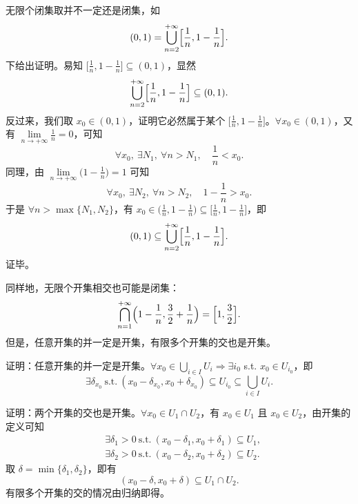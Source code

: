 \documentclass[UTF8,11pt]{ctexart}
\theoremstyle{cnthm}
\begin{document}
无限个闭集取并不一定还是闭集，如
\[
(0,1)=\bigcup_{n=2}^{+\infty}\Bigl[\frac{1}{n},1-\frac{1}{n}\Bigr].
\]
下给出证明。易知 $\bigl[\frac{1}{n},1-\frac{1}{n}\bigr]\subseteq(0,1)$，显然
\[
\bigcup_{n=2}^{+\infty}\Bigl[\frac{1}{n},1-\frac{1}{n}\Bigr]\subseteq(0,1).
\]
反过来，我们取 $x_0\in(0,1)$，证明它必然属于某个 $\bigl[\frac{1}{n},1-\frac{1}{n}\bigr]$。$\forall x_0\in(0,1)$，又有 $\lim\limits_{n\to+\infty}\frac{1}{n}=0$，可知
\[
\forall x_0,\ \exists N_1,\ \forall n>N_1,\quad \frac{1}{n}<x_0.
\]
同理，由 $\lim\limits_{n\to+\infty}\bigl(1-\frac{1}{n}\bigr)=1$ 可知
\[
\forall x_0,\ \exists N_2,\ \forall n>N_2,\quad 1-\frac{1}{n}>x_0.
\]
于是 $\forall n>\max\{N_1,N_2\}$，有 $x_0\in\bigl(\frac{1}{n},1-\frac{1}{n}\bigr)\subseteq\bigl[\frac{1}{n},1-\frac{1}{n}\bigr]$，即
\[
(0,1)\subseteq\bigcup_{n=2}^{+\infty}\Bigl[\frac{1}{n},1-\frac{1}{n}\Bigr].
\]
证毕。

同样地，无限个开集相交也可能是闭集：
\[
\bigcap_{n=1}^{+\infty}\Bigl(1-\frac{1}{n},\frac{3}{2}+\frac{1}{n}\Bigr)
=\Bigl[1,\frac{3}{2}\Bigr].
\]
但是，任意开集的并一定是开集，有限多个开集的交也是开集。

证明：任意开集的并一定是开集。$\forall x_0\in\bigcup\limits_{i\in I}U_i\Rightarrow\exists i_0$ s.t. $x_0\in U_{i_0}$，即
\[
\exists\delta_{x_0}\ \text{s.t.}\
(x_0-\delta_{x_0},x_0+\delta_{x_0})\subseteq U_{i_0}
\subseteq\bigcup_{i\in I}U_i.
\]

证明：两个开集的交也是开集。$\forall x_0\in U_1\cap U_2$，有 $x_0\in U_1$ 且 $x_0\in U_2$，由开集的定义可知
\[
\begin{aligned}
&\exists\delta_1>0\ \text{s.t.}\ (x_0-\delta_1,x_0+\delta_1)\subseteq U_1,\\
&\exists\delta_2>0\ \text{s.t.}\ (x_0-\delta_2,x_0+\delta_2)\subseteq U_2.
\end{aligned}
\]
取 $\delta=\min\{\delta_1,\delta_2\}$，即有
\[
(x_0-\delta,x_0+\delta)\subseteq U_1\cap U_2.
\]
有限多个开集的交的情况由归纳即得。
\end{document}
